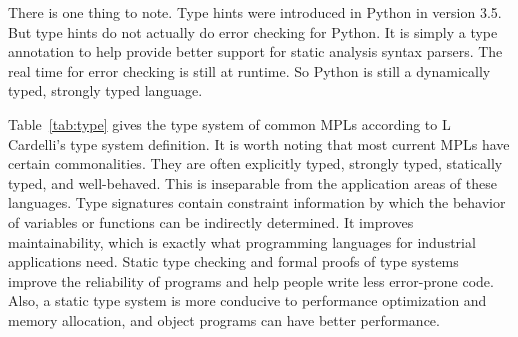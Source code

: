 There is one thing to note.
Type hints were introduced in Python in version 3.5.
But type hints do not actually do error checking for Python.
It is simply a type annotation to help provide better support
for static analysis syntax parsers.
The real time for error checking is still at runtime.
So Python is still a dynamically typed, strongly typed language.

Table~\ref{tab:type} gives the type system of common MPLs according
to L Cardelli's type system definition.
It is worth noting that most current MPLs have certain commonalities.
They are often explicitly typed, strongly typed, statically typed, and well-behaved.
This is inseparable from the application areas of these languages.
Type signatures contain constraint information by which the behavior of
variables or functions can be indirectly determined.
It improves maintainability, which is exactly what programming languages
for industrial applications need.
Static type checking and formal proofs of type systems improve the reliability
of programs and help people write less error-prone code.
Also, a static type system is more conducive to performance optimization
and memory allocation, and object programs can have better performance.

